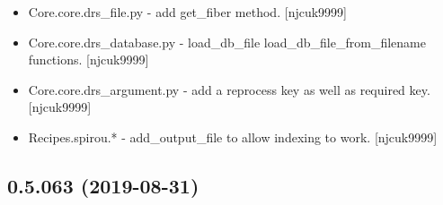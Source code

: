 \documentclass[a4paper,10pt,english]{report}
\begin{document}
\begin{itemize}
\item {} 
Core.core.drs\_file.py - add get\_fiber method. {[}njcuk9999{]}

\item {} 
Core.core.drs\_database.py - load\_db\_file load\_db\_file\_from\_filename
functions. {[}njcuk9999{]}

\item {} 
Core.core.drs\_argument.py - add a reprocess key as well as required
key. {[}njcuk9999{]}

\item {} 
Recipes.spirou.* - add\_output\_file to allow indexing to work.
{[}njcuk9999{]}

\end{itemize}


\subsection{0.5.063 (2019-08-31)}
\end{document}
